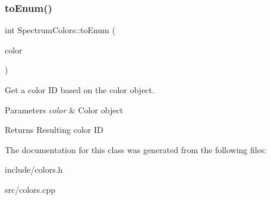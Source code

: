 \subsubsection{\texorpdfstring{to\+Enum()}{toEnum()}}
{\footnotesize\ttfamily int Spectrum\+Colors\+::to\+Enum (\begin{DoxyParamCaption}\item[{const Q\+Color \&}]{color }\end{DoxyParamCaption})\hspace{0.3cm}{\ttfamily [static]}}



Get a color ID based on the color object. 


\begin{DoxyParams}{Parameters}
{\em color} & Color object \\
\hline
\end{DoxyParams}
\begin{DoxyReturn}{Returns}
Resulting color ID 
\end{DoxyReturn}


The documentation for this class was generated from the following files\+:\begin{DoxyCompactItemize}
\item 
include/colors.\+h\item 
src/colors.\+cpp\end{DoxyCompactItemize}
